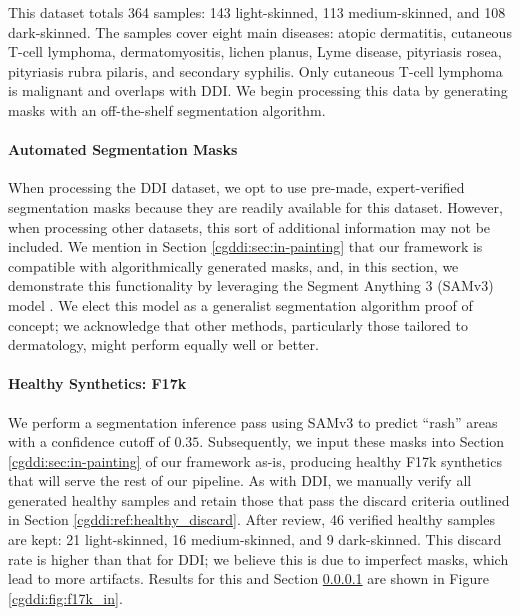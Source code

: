 \documentclass[11pt]{ucthesis}
\begin{document}
This dataset totals 364 samples: 143 light-skinned, 113 medium-skinned, and 108 dark-skinned. The samples cover eight main diseases: atopic dermatitis, cutaneous T-cell lymphoma, dermatomyositis, lichen planus, Lyme disease, pityriasis rosea, pityriasis rubra pilaris, and secondary syphilis. Only cutaneous T-cell lymphoma is malignant and overlaps with DDI. We begin processing this data by generating masks with an off-the-shelf segmentation algorithm.

\paragraph{Automated Segmentation Masks}
\label{cgddi:samv3}

When processing the DDI dataset, we opt to use pre-made, expert-verified segmentation masks \cite{carrion-2023} because they are readily available for this dataset. However, when processing other datasets, this sort of additional information may not be included. We mention in Section \ref{cgddi:sec:in-painting} that our framework is compatible with algorithmically generated masks, and, in this section, we demonstrate this functionality by leveraging the Segment Anything 3 (SAMv3) model \cite{carion2025sam3segmentconcepts}. We elect this model as a generalist segmentation algorithm proof of concept; we acknowledge that other methods, particularly those tailored to dermatology, might perform equally well or better.


\paragraph{Healthy Synthetics: F17k}

We perform a segmentation inference pass using SAMv3 to predict ``rash'' areas with a confidence cutoff of $0.35$. Subsequently, we input these masks into Section \ref{cgddi:sec:in-painting} of our framework as-is, producing healthy F17k synthetics that will serve the rest of our pipeline. As with DDI, we manually verify all generated healthy samples and retain those that pass the discard criteria outlined in Section \ref{cgddi:ref:healthy_discard}. After review, 46 verified healthy samples are kept: 21 light-skinned, 16 medium-skinned, and 9 dark-skinned. This discard rate is higher than that for DDI; we believe this is due to imperfect masks, which lead to more artifacts. Results for this and Section \ref{cgddi:samv3} are shown in Figure \ref{cgddi:fig:f17k_in}.
\end{document}
